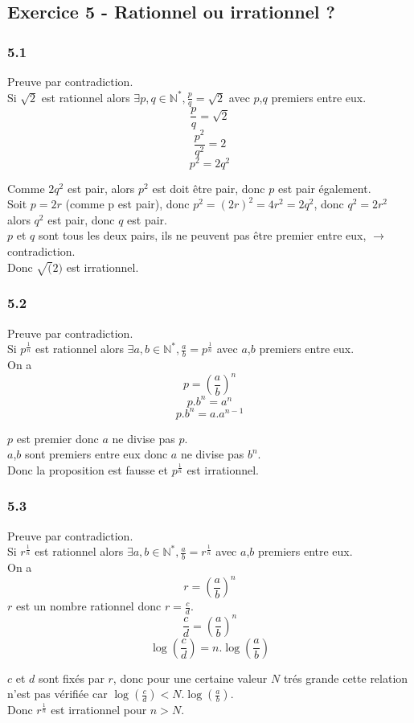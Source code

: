 \documentclass[]{book}
\theoremstyle{definition}
\newcommand{\bb}[1]{\mathbb{#1}}
\newcommand{\N}{\bb{N}}
\begin{document}
\subsection*{Exercice 5 - Rationnel ou irrationnel ?}
\subsubsection*{5.1}
Preuve par contradiction.\\

Si $\sqrt{2}$ est rationnel alors $\exists p, q \in \N^{*}, \frac{p}{q}=\sqrt{2}$ avec $p$,$q$ premiers entre eux.
$$\frac{p}{q}=\sqrt{2}$$
$$\frac{p^2}{q^2}=2$$
$$p^2=2q^2$$

Comme $2q^2$ est pair, alors $p^2$ est doit \^etre pair, donc $p$ est pair \'egalement.\\
Soit $p=2r$ (comme p est pair), donc $p^2=(2r)^2 = 4r^2 = 2q^2$, donc $q^2 = 2r^2$ alors $q^2$ est pair, donc $q$ est pair.\\
$p$ et $q$ sont tous les deux pairs, ils ne peuvent pas \^etre premier entre eux, $\to$ contradiction.\\
Donc $\sqrt(2)$ est irrationnel. 

\subsubsection*{5.2}
Preuve par contradiction.\\

Si $p^{\frac{1}{n}}$ est rationnel alors  $\exists a, b \in \N^{*}, \frac{a}{b}=p^{\frac{1}{n}}$ avec $a$,$b$ premiers entre eux.\\
On a 
$$p = \left(\frac{a}{b}\right)^{n}$$
$$p.b^{n} = a^{n}$$
$$p.b^{n} = a.a^{n-1}$$

$p$ est premier donc $a$ ne divise pas $p$.\\
$a$,$b$ sont premiers entre eux donc $a$ ne divise pas $b^n$.\\
Donc la proposition est fausse et $p^{\frac{1}{n}}$ est irrationnel.

\subsubsection*{5.3}
Preuve par contradiction.\\
Si $r^{\frac{1}{n}}$ est rationnel alors  $\exists a, b \in \N^{*}, \frac{a}{b}=r^{\frac{1}{n}}$ avec $a$,$b$ premiers entre eux.\\
On a 
$$r = \left(\frac{a}{b}\right)^{n}$$
$r$ est un nombre rationnel donc $r=\frac{c}{d}$.
$$\frac{c}{d} = \left(\frac{a}{b}\right)^{n}$$
$$\log\left(\frac{c}{d}\right) = n.\log\left(\frac{a}{b}\right)$$

$c$ et $d$ sont fix\'es par $r$, donc pour une certaine valeur $N$ tr\'es grande cette relation n'est pas v\'erifi\'ee car $\log\left(\frac{c}{d}\right) < N.\log\left(\frac{a}{b}\right)$.\\
Donc $r^{\frac{1}{n}}$ est irrationnel pour $n>N$.
\end{document}
